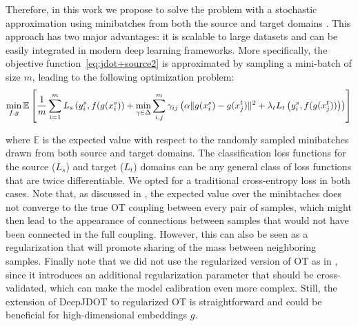 \documentclass[runningheads]{llncs}
\begin{document}
Therefore, in this work we propose to solve the problem with a stochastic approximation using minibatches from both the source and target domains \cite{genevay2017sinkhorn}. This approach has two major advantages: it is scalable to large datasets and can be easily integrated in modern deep learning frameworks.
More specifically, the objective function~\eqref{eq:jdot+source2} is approximated by sampling a mini-batch of size $m$, {leading to the following optimization problem:}
 \begin{equation}
 \small
  \min_{f,g} \mathbb{E}\left[\frac{1}{m}\sum_{i=1}^{m} L_s\left(y_i^s, f(g(x_i^s)\right) +\min_{\gamma\in\Delta}\sum_{i,j}^{m} \gamma_{ij} \left(\alpha \Vert g(x_i^s) - g(x_j^t) \Vert^2 + \lambda_t L_t\left(y_i^s,f(g(x_j^t))\right) \right)\right]
  \label{eq:jdot+source_batch}
  \end{equation}

where $\mathbb{E}$ is the expected value with respect to the randomly sampled minibatches drawn from both source and target domains. The classification loss functions for the source ($L_s$) and target ($L_t$) domains can be any general class of loss functions that are twice differentiable. We opted for a traditional cross-entropy loss in both cases. Note that, as discussed in \cite{genevay2017sinkhorn}, the expected value over the minibtaches does not converge to the true OT coupling between every pair of samples, which might then lead to the appearance of connections between samples that would not have been connected in the full coupling. However, this can also be seen as a regularization that will promote sharing of the mass between neighboring samples. Finally note that we did not use the regularized version of OT as in \cite{genevay2017sinkhorn}, since it introduces an additional regularization parameter that should be cross-validated, which can make the model calibration even more complex. Still, the extension of DeepJDOT to regularized OT is straightforward and could be beneficial for high-dimensional embeddings $g$.
\end{document}
